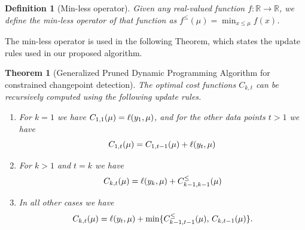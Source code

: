 \documentclass{article}
\newtheorem{theorem}{Theorem}
\newtheorem{definition}{Definition}
\newcommand{\RR}{\mathbb R}
\begin{document}
\begin{definition}[Min-less operator]
  Given any real-valued function $f:\RR\rightarrow\RR$, we define the min-less
  operator of that function as $f^\leq(\mu)=\min_{x\leq \mu} f(x)$.
\end{definition}

The min-less operator is used in the following Theorem, which states
the update rules used in our proposed algorithm.

\begin{theorem}[Generalized Pruned Dynamic Programming Algorithm
  for constrained changepoint detection]
  The optimal cost functions $C_{k,t}$ can be recursively computed
  using the following update rules.
\begin{enumerate}
\item For $k=1$ we have
$C_{1,1}(\mu)=\ell(y_1,\mu)$, and for the other data
  points $t>1$ we have
\begin{equation}
C_{1,t}(\mu)=C_{1,t-1}(\mu)+\ell(y_t,\mu)
\end{equation}
\item For $k>1$ and $t=k$ we have
\begin{equation}
  C_{k,t}(\mu)=\ell(y_k, \mu)+C_{k-1,k-1}^\leq(\mu)
\end{equation}
\item In all other cases we have
  \begin{equation}
  C_{k,t}(\mu)=\ell(y_t,\mu)+
  \min\{
  C_{k-1,t-1}^\leq(\mu),\,
  C_{k,t-1}(\mu)
  \}.
  \end{equation}
\end{enumerate}
\end{theorem}
\end{document}
